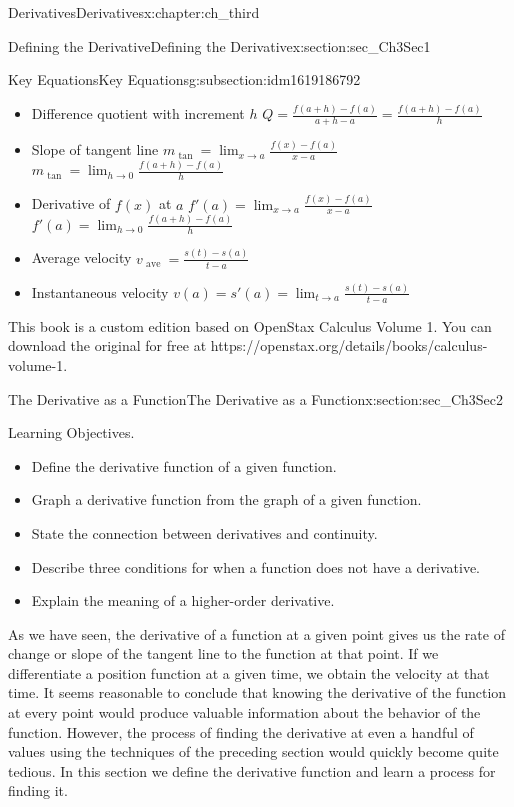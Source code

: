 \documentclass[oneside,10pt,]{book}
\numberwithin{equation}{section}
\begin{document}
\begin{chapterptx}{Derivatives}{}{Derivatives}{}{}{x:chapter:ch_third}
\begin{sectionptx}{Defining the Derivative}{}{Defining the Derivative}{}{}{x:section:sec_Ch3Sec1}
\begin{subsectionptx}{Key Equations}{}{Key Equations}{}{}{g:subsection:idm1619186792}
\begin{itemize}[label=\textbullet]
\item{}Difference quotient with increment \(h\) \(Q=\frac{f(a+h)-f(a)}{a+h-a}=\frac{f(a+h)-f(a)}{h}\)%
\item{}Slope of tangent line \(m_{\text{ tan }}=\lim_{x\to a}\frac{f(x)-f(a)}{x-a}\) \(m_{\text{ tan }}=\lim_{h\to 0}\frac{f(a+h)-f(a)}{h}\)%
\item{}Derivative of \(f(x)\) at \(a\) \(f'(a)=\lim_{x\to a}\frac{f(x)-f(a)}{x-a}\) \(f'(a)=\lim_{h\to 0}\frac{f(a+h)-f(a)}{h}\)%
\item{}Average velocity \(v_{\text{ ave }}=\frac{s(t)-s(a)}{t-a}\)%
\item{}Instantaneous velocity \(v(a)=s'(a)=\lim_{t\to a}\frac{s(t)-s(a)}{t-a}\)%
\end{itemize}
\end{subsectionptx}
This book is a custom edition based on OpenStax Calculus Volume 1. You can download the original for free at https:\slash{}\slash{}openstax.org\slash{}details\slash{}books\slash{}calculus-volume-1.%
\end{sectionptx}
%
%
\typeout{************************************************}
\typeout{************************************************}
%
\begin{sectionptx}{The Derivative as a Function}{}{The Derivative as a Function}{}{}{x:section:sec_Ch3Sec2}
\begin{introduction}{Learning Objectives.}%
%
\begin{itemize}[label=\textbullet]
\item{}Define the derivative function of a given function.%
\item{}Graph a derivative function from the graph of a given function.%
\item{}State the connection between derivatives and continuity.%
\item{}Describe three conditions for when a function does not have a derivative.%
\item{}Explain the meaning of a higher-order derivative.%
\end{itemize}
As we have seen, the derivative of a function at a given point gives us the rate of change or slope of the tangent line to the function at that point. If we differentiate a position function at a given time, we obtain the velocity at that time. It seems reasonable to conclude that knowing the derivative of the function at every point would produce valuable information about the behavior of the function. However, the process of finding the derivative at even a handful of values using the techniques of the preceding section would quickly become quite tedious. In this section we define the derivative function and learn a process for finding it.%

\end{introduction}
\end{sectionptx}
\end{chapterptx}
\end{document}
